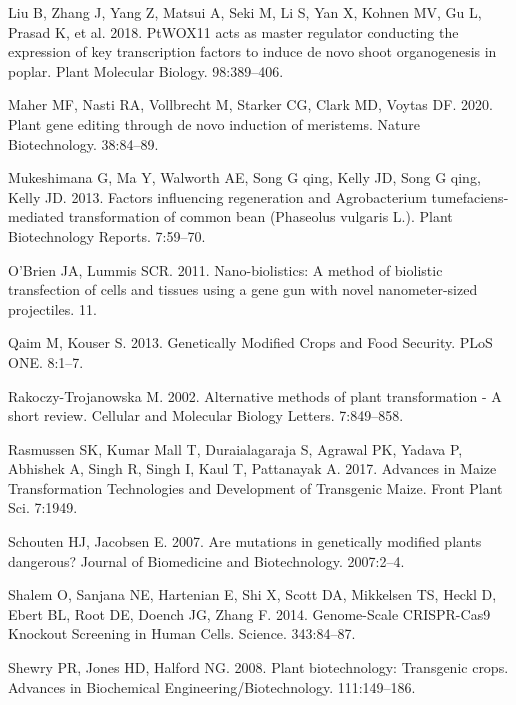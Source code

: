 \documentclass[
]{article}
\newlength{\cslhangindent}
\newenvironment{CSLReferences}[2] %
 {%
  \setlength{\parindent}{0pt}
  \ifodd #1 \everypar{\setlength{\hangindent}{\cslhangindent}}\ignorespaces\fi
  \ifnum #2 > 0
  \setlength{\parskip}{#2\baselineskip}
  \fi
 }%
 {}
\begin{document}
\begin{CSLReferences}{0}{0}
\leavevmode{}%
Liu B, Zhang J, Yang Z, Matsui A, Seki M, Li S, Yan X, Kohnen MV, Gu L,
Prasad K, et al. 2018. {PtWOX11 acts as master regulator conducting the
expression of key transcription factors to induce de novo shoot
organogenesis in poplar}. Plant Molecular Biology. 98:389--406.

\leavevmode{}%
Maher MF, Nasti RA, Vollbrecht M, Starker CG, Clark MD, Voytas DF. 2020.
{Plant gene editing through de novo induction of meristems}. Nature
Biotechnology. 38:84--89.

\leavevmode{}%
Mukeshimana G, Ma Y, Walworth AE, Song G qing, Kelly JD, Song G qing,
Kelly JD. 2013. {Factors influencing regeneration and Agrobacterium
tumefaciens-mediated transformation of common bean (Phaseolus vulgaris
L.)}. Plant Biotechnology Reports. 7:59--70.

\leavevmode{}%
O'Brien JA, Lummis SCR. 2011. {Nano-biolistics: A method of biolistic
transfection of cells and tissues using a gene gun with novel
nanometer-sized projectiles}. 11.

\leavevmode{}%
Qaim M, Kouser S. 2013. {Genetically Modified Crops and Food Security}.
PLoS ONE. 8:1--7.

\leavevmode{}%
Rakoczy-Trojanowska M. 2002. {Alternative methods of plant
transformation - A short review}. Cellular and Molecular Biology
Letters. 7:849--858.

\leavevmode{}%
Rasmussen SK, Kumar Mall T, Duraialagaraja S, Agrawal PK, Yadava P,
Abhishek A, Singh R, Singh I, Kaul T, Pattanayak A. 2017. {Advances in
Maize Transformation Technologies and Development of Transgenic Maize}.
Front Plant Sci. 7:1949.

\leavevmode{}%
Schouten HJ, Jacobsen E. 2007. {Are mutations in genetically modified
plants dangerous?} Journal of Biomedicine and Biotechnology. 2007:2--4.

\leavevmode{}%
Shalem O, Sanjana NE, Hartenian E, Shi X, Scott DA, Mikkelsen TS, Heckl
D, Ebert BL, Root DE, Doench JG, Zhang F. 2014. {Genome-Scale
CRISPR-Cas9 Knockout Screening in Human Cells}. Science. 343:84--87.

\leavevmode{}%
Shewry PR, Jones HD, Halford NG. 2008. {Plant biotechnology: Transgenic
crops}. Advances in Biochemical Engineering/Biotechnology. 111:149--186.


\end{CSLReferences}
\end{document}
